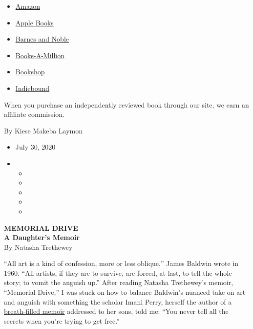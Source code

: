 \begin{itemize}
\tightlist
\item
  \href{https://www.amazon.com/gp/search?index=books\&tag=NYTBSREV-20\&field-keywords=Memorial+Drive\%3A+A+Daughter\%27s+Memoir+Natastha+Trethewey}{Amazon}
\item
  \href{https://du-gae-books-dot-nyt-du-prd.appspot.com/buy?title=Memorial+Drive\%3A+A+Daughter\%27s+Memoir\&author=Natastha+Trethewey}{Apple
  Books}
\item
  \href{https://www.anrdoezrs.net/click-7990613-11819508?url=https\%3A\%2F\%2Fwww.barnesandnoble.com\%2Fs\%2FMemorial+Drive\%3A+A+Daughter\%27s+Memoir+Natastha+Trethewey}{Barnes
  and Noble}
\item
  \href{https://www.anrdoezrs.net/click-7990613-35140?url=https\%3A\%2F\%2Fwww.booksamillion.com\%2Fsearch\%3Fquery\%3DMemorial\%2BDrive\%253A\%2BA\%2BDaughter\%2527s\%2BMemoir\%2BNatastha\%2BTrethewey}{Books-A-Million}
\item
  \href{https://bookshop.org/books?keywords=Memorial+Drive\%3A+A+Daughter\%27s+Memoir}{Bookshop}
\item
  \href{https://www.indiebound.org/search/book?searchfor=Memorial+Drive\%3A+A+Daughter\%27s+Memoir+Natastha+Trethewey\&aff=NYT}{Indiebound}
\end{itemize}

When you purchase an independently reviewed book through our site, we
earn an affiliate commission.

By Kiese Makeba Laymon

\begin{itemize}
\item
  July 30, 2020
\item
  \begin{itemize}
  \item
  \item
  \item
  \item
  \item
  \end{itemize}
\end{itemize}

\textbf{MEMORIAL DRIVE}\\
\textbf{A Daughter's Memoir}\\
By Natasha Trethewey

``All art is a kind of confession, more or less oblique,'' James Baldwin
wrote in 1960. ``All artists, if they are to survive, are forced, at
last, to tell the whole story; to vomit the anguish up.'' After reading
Natasha Trethewey's memoir, ``Memorial Drive,'' I was stuck on how to
balance Baldwin's nuanced take on art and anguish with something the
scholar Imani Perry, herself the author of a
\href{https://www.nytimes3xbfgragh.onion/2019/09/28/books/review/breathe-imani-perry.html?searchResultPosition=3}{breath-filled
memoir} addressed to her sons, told me: ``You never tell all the secrets
when you're trying to get free.''

